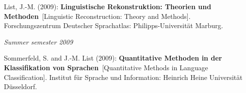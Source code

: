 \nopagebreak\noindent List, J.-M. (2009): \textbf{Linguistische Rekonstruktion: Theorien und Methoden}\ [Linguistic Reconstruction: Theory and Methods]. Forschungszentrum Deutscher Sprachatlas: Philipps-Universität Marburg.\vspace{0.25cm}
\par
\noindent\textit{Summer semester 2009}\par\nopagebreak\vspace{0.25cm}
\nopagebreak\noindent Sommerfeld, S. and J.-M. List (2009): \textbf{Quantitative Methoden in der Klassifikation von Sprachen}\ [Quantitative Methods in Language Classification]. Institut für Sprache und Information: Heinrich Heine Universität Düsseldorf.\vspace{0.25cm}
\par
